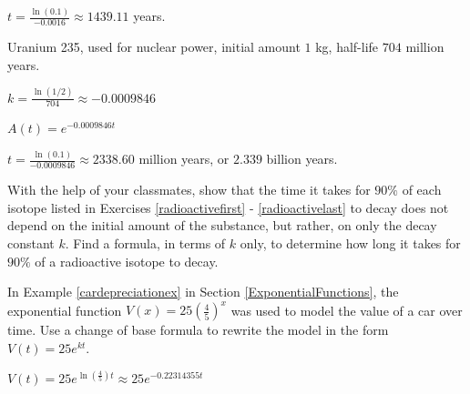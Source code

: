\documentclass{ximera}
\begin{document}
\begin{question}
\begin{problem}
\begin{solution}
    $t = \frac{\ln(0.1)}{-0.0016} \approx 1439.11$ years.
\end{solution}
    
\end{problem}

\begin{problem}\label{radioactivelast}
    Uranium 235, used for nuclear power, initial amount $1$ kg, half-life  $704$ million years.
    
\begin{solution}
     $k = \frac{\ln(1/2)}{704} \approx -0.0009846$
\end{solution}

\begin{solution}
    $A(t) = e^{-0.0009846t}$
\end{solution}

\begin{solution}
    $t = \frac{\ln(0.1)}{-0.0009846} \approx 2338.60$ million years, or $2.339$ billion years.
\end{solution}
    
\end{problem}

\end{question}

\begin{problem}
With the help of your classmates, show that the time it takes for $90 \%$ of each isotope listed in Exercises \ref{radioactivefirst} - \ref{radioactivelast} to decay does not depend on the initial amount of the substance, but rather, on only the decay constant $k$. Find a formula, in terms of $k$ only, to determine how long it takes for $90 \%$ of a radioactive isotope to decay. 
\end{problem}

\begin{problem}
 In Example \ref{cardepreciationex} in Section \ref{ExponentialFunctions}, the exponential function $V(x) = 25 \left(\frac{4}{5}\right)^{x}$ was used to model the value of a car over time.  Use a change of base formula to rewrite the model in the form $V(t) = 25e^{kt}$.

\begin{solution}
    $V(t) = 25e^{\ln\left(\frac{4}{5}\right)t} \approx 25e^{-0.22314355t}$
\end{solution}
 
\end{problem}
\end{document}
